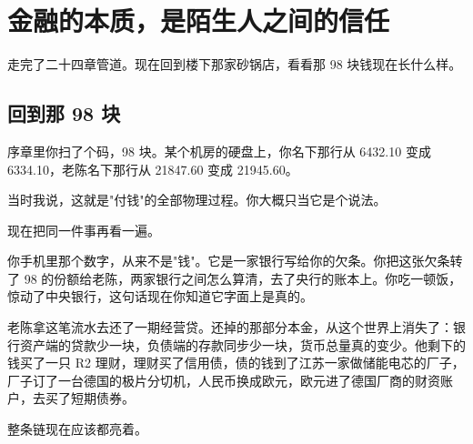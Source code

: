 \chapter{金融的本质，是陌生人之间的信任}

\begin{ledetext}
走完了二十四章管道。现在回到楼下那家砂锅店，看看那 98 块钱现在长什么样。
\end{ledetext}

\section{回到那 98 块}

序章里你扫了个码，98 块。某个机房的硬盘上，你名下那行从 6432.10 变成 6334.10，老陈名下那行从 21847.60 变成 21945.60。

当时我说，这就是"付钱"的全部物理过程。你大概只当它是个说法。

现在把同一件事再看一遍。

\begin{bsheet}
\end{bsheet}

你手机里那个数字，从来不是"钱"。它是一家银行写给你的欠条。你把这张欠条转了 98 的份额给老陈，两家银行之间怎么算清，去了央行的账本上。你吃一顿饭，惊动了中央银行，这句话现在你知道它字面上是真的。

老陈拿这笔流水去还了一期经营贷。还掉的那部分本金，从这个世界上消失了：银行资产端的贷款少一块，负债端的存款同步少一块，货币总量真的变少。他剩下的钱买了一只 R2 理财，理财买了信用债，债的钱到了江苏一家做储能电芯的厂子，厂子订了一台德国的极片分切机，人民币换成欧元，欧元进了德国厂商的财资账户，去买了短期债券。

整条链现在应该都亮着。

\begin{chainflow}
\chainarrow {}\chainarrow {}\chainarrow {}\chainarrow {}\chainarrow {}\chainarrow {}\chainarrow {}\chainarrow {}\chainarrow {}\chainarrow {}\chainarrow {}
\end{chainflow}

